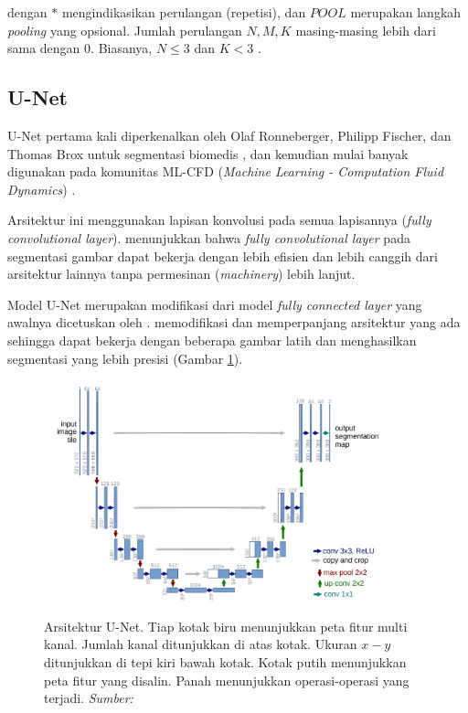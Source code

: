 dengan $*$ mengindikasikan perulangan (repetisi), dan $POOL$ merupakan langkah \emph{pooling} yang opsional. Jumlah perulangan $N, M, K$ masing-masing lebih dari sama dengan $0$. Biasanya, $N \leq 3$ dan $K < 3$ \citep{zhang2020dive}.

\subsection{U-Net}\label{sub_unet}
U-Net pertama kali diperkenalkan oleh Olaf Ronneberger, Philipp Fischer, dan Thomas Brox untuk segmentasi biomedis \citep{DBLP:journals/corr/RonnebergerFB15}, dan kemudian mulai banyak digunakan pada komunitas ML-CFD (\emph{Machine Learning - Computation Fluid Dynamics}) \citep{DBLP:journals/corr/abs-2109-13076}.

Arsitektur ini menggunakan lapisan konvolusi pada semua lapisannya (\emph{fully convolutional layer}). \cite{DBLP:journals/corr/LongSD14} menunjukkan bahwa \emph{fully convolutional layer} pada segmentasi gambar dapat bekerja dengan lebih efisien dan lebih canggih dari arsitektur lainnya tanpa permesinan (\emph{machinery}) lebih lanjut.

Model U-Net merupakan modifikasi dari model \emph{fully connected layer} yang awalnya dicetuskan oleh \cite{DBLP:journals/corr/LongSD14}. \cite{DBLP:journals/corr/RonnebergerFB15} memodifikasi dan memperpanjang arsitektur yang ada sehingga dapat bekerja dengan beberapa gambar latih dan menghasilkan segmentasi yang lebih presisi (Gambar \ref{unet}).

\begin{figure}[h]
    \centering
    \includegraphics[width=10cm]{gambar/snapedit_1694701272217.png}
    \caption{Arsitektur U-Net. Tiap kotak biru menunjukkan peta fitur multi kanal. Jumlah kanal ditunjukkan di atas kotak. Ukuran $x-y$ ditunjukkan di tepi kiri bawah kotak. Kotak putih menunjukkan peta fitur yang disalin. Panah menunjukkan operasi-operasi yang terjadi. \emph{Sumber: \citep{DBLP:journals/corr/RonnebergerFB15}}}
    \label{unet}
\end{figure}

